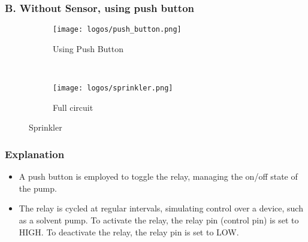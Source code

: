 \documentclass[table,french,english]{rapportCS}
\begin{document}
\newpage
\subsubsection{B. Without Sensor, using push button}
\begin{figure}[h]
    \centering
    \begin{subfigure}{0.4\textwidth}\label{sec:figone}
        \centering
        \texttt{[image: logos/push\_button.png]}
        \caption{Using Push Button}
    \end{subfigure}\hspace{0.1\textwidth}%
    \\
    \vspace{0.5cm}
    \begin{subfigure}{0.5\textwidth}\label{sec:figtwo}
        \centering
        \texttt{[image: logos/sprinkler.png]}
        \caption{Full circuit}
    \end{subfigure}
    \caption{Sprinkler}
\end{figure}

\subsubsection*{Explanation}
\begin{itemize}[label=$\bullet$]
    \item A push button is employed to toggle the relay, managing the on/off state of the pump.
    \item The relay is cycled at regular intervals, simulating control over a device, such as a solvent pump.
     To activate the relay, the relay pin (control pin) is set to HIGH.
     To deactivate the relay, the relay pin is set to LOW.
\end{itemize}
\newpage
\end{document}
